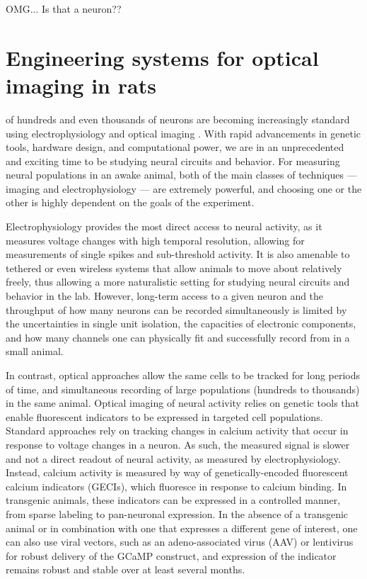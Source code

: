 \begin{savequote}[75mm]
OMG... Is that a neuron??
\end{savequote}

\chapter{Engineering systems for optical imaging in rats}
 of hundreds and even thousands of neurons are becoming increasingly standard using electrophysiology \cite{Steinmetz2019DistributedBehaviour, REFREF} and optical imaging \cite{Stringer2019High-dimensionalCortex, REFREF}. With rapid advancements in genetic tools, hardware design, and computational power, we are in an unprecedented and exciting time to be studying neural circuits and behavior. For measuring neural populations in an awake animal, both of the main classes of techniques --- imaging and electrophysiology --- are extremely powerful, and choosing one or the other is highly dependent on the goals of the experiment. 

Electrophysiology provides the most direct access to neural activity, as it measures voltage changes with high temporal resolution, allowing for measurements of single spikes and sub-threshold activity\cite{REFREF}. It is also amenable to tethered or even wireless systems that allow animals to move about relatively freely, thus allowing a more naturalistic setting for studying neural circuits and behavior in the lab\cite{REFREF}. However, long-term access to a given neuron and the throughput of how many neurons can be recorded simultaneously is limited by the uncertainties in single unit isolation, the capacities of electronic components, and how many channels one can physically fit and successfully record from in a small animal. 

In contrast, optical approaches allow the same cells to be tracked for long periods of time, and simultaneous recording of large populations (hundreds to thousands) in the same animal. Optical imaging of neural activity relies on genetic tools that enable fluorescent indicators to be expressed in targeted cell populations. Standard approaches rely on tracking changes in calcium activity that occur in response to voltage changes in a neuron\cite{REFREF}. As such, the measured signal is slower and not a direct readout of neural activity, as measured by electrophysiology. Instead, calcium activity is measured by way of genetically-encoded fluorescent calcium indicators (GECIs)\cite{Akerboom2012, Chen2013}, which fluoresce in response to calcium binding. In transgenic animals, these indicators can be expressed in a controlled manner, from sparse labeling\cite{REFREF} to pan-neuronal expression\cite{REFREF}. In the absence of a transgenic animal or in combination with one that expresses a different gene of interest, one can also use viral vectors, such as an adeno-associated virus (AAV) or lentivirus\cite{REFREF} for robust delivery of the GCaMP construct, and expression of the indicator remains robust and stable over at least several months\cite{REFREF}.

